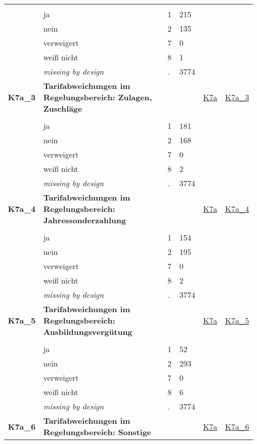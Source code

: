 \begin{longtable}{| L{2.45cm} | L{6cm} | C{1.5cm} | R{1cm} | C{2.25cm} | C{2.25cm} |}
   &  &  &  &  &  \\ 
   & ja & 1 & 215 &  &  \\ 
   & nein & 2 & 135 &  &  \\ 
   & verweigert & 7 & 0 &  &  \\ 
   & weiß nicht & 8 & 1 &  &  \\ 
   & \textit{missing by design} & \textit{.} & 3774 &  &  \\ 
   \midrule
\textbf{K7a\_3}\label{var:K7a:3} & \textbf{Tarifabweichungen im Regelungsbereich: Zulagen, Zuschläge} &  &  & \hyperref[K7a]{K7a} & \hyperref[var:suf:K7a:3]{K7a\_3} \\ 
   &  &  &  &  &  \\ 
   & ja & 1 & 181 &  &  \\ 
   & nein & 2 & 168 &  &  \\ 
   & verweigert & 7 & 0 &  &  \\ 
   & weiß nicht & 8 & 2 &  &  \\ 
   & \textit{missing by design} & \textit{.} & 3774 &  &  \\ 
   \midrule
\textbf{K7a\_4}\label{var:K7a:4} & \textbf{Tarifabweichungen im Regelungsbereich: Jahressonderzahlung} &  &  & \hyperref[K7a]{K7a} & \hyperref[var:suf:K7a:4]{K7a\_4} \\ 
   &  &  &  &  &  \\ 
   & ja & 1 & 154 &  &  \\ 
   & nein & 2 & 195 &  &  \\ 
   & verweigert & 7 & 0 &  &  \\ 
   & weiß nicht & 8 & 2 &  &  \\ 
   & \textit{missing by design} & \textit{.} & 3774 &  &  \\ 
   \midrule
\textbf{K7a\_5}\label{var:K7a:5} & \textbf{Tarifabweichungen im Regelungsbereich: Ausbildungsvergütung} &  &  & \hyperref[K7a]{K7a} & \hyperref[var:suf:K7a:5]{K7a\_5} \\ 
   &  &  &  &  &  \\ 
   & ja & 1 & 52 &  &  \\ 
   & nein & 2 & 293 &  &  \\ 
   & verweigert & 7 & 0 &  &  \\ 
   & weiß nicht & 8 & 6 &  &  \\ 
   & \textit{missing by design} & \textit{.} & 3774 &  &  \\ 
   \midrule
\textbf{K7a\_6}\label{var:K7a:6} & \textbf{Tarifabweichungen im Regelungsbereich: Sonstige} &  &  & \hyperref[K7a]{K7a} & \hyperref[var:suf:K7a:6]{K7a\_6} \\ 

\end{longtable}
